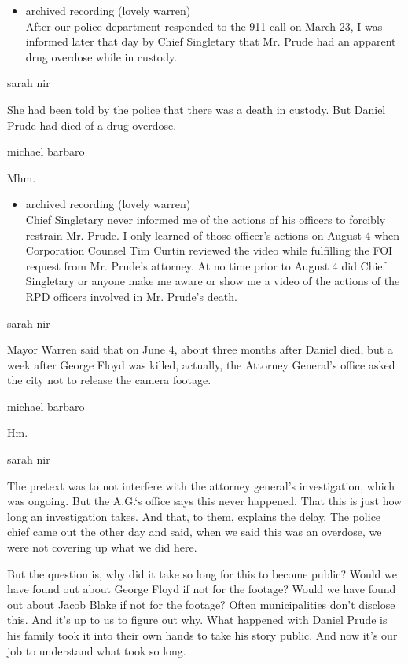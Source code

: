 \begin{itemize}
\tightlist
\item
  archived recording (lovely warren)\\
  After our police department responded to the 911 call on March 23, I
  was informed later that day by Chief Singletary that Mr. Prude had an
  apparent drug overdose while in custody.
\end{itemize}

sarah nir

She had been told by the police that there was a death in custody. But
Daniel Prude had died of a drug overdose.

michael barbaro

Mhm.

\begin{itemize}
\tightlist
\item
  archived recording (lovely warren)\\
  Chief Singletary never informed me of the actions of his officers to
  forcibly restrain Mr. Prude. I only learned of those officer's actions
  on August 4 when Corporation Counsel Tim Curtin reviewed the video
  while fulfilling the FOI request from Mr. Prude's attorney. At no time
  prior to August 4 did Chief Singletary or anyone make me aware or show
  me a video of the actions of the RPD officers involved in Mr. Prude's
  death.
\end{itemize}

sarah nir

Mayor Warren said that on June 4, about three months after Daniel died,
but a week after George Floyd was killed, actually, the Attorney
General's office asked the city not to release the camera footage.

michael barbaro

Hm.

sarah nir

The pretext was to not interfere with the attorney general's
investigation, which was ongoing. But the A.G.`s office says this never
happened. That this is just how long an investigation takes. And that,
to them, explains the delay. The police chief came out the other day and
said, when we said this was an overdose, we were not covering up what we
did here.

But the question is, why did it take so long for this to become public?
Would we have found out about George Floyd if not for the footage? Would
we have found out about Jacob Blake if not for the footage? Often
municipalities don't disclose this. And it's up to us to figure out why.
What happened with Daniel Prude is his family took it into their own
hands to take his story public. And now it's our job to understand what
took so long.

